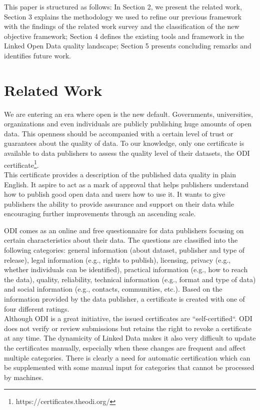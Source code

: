 \documentclass[onecolumn, crcready]{iosart2c}
\begin{document}
This paper is structured as follows: In Section 2, we present the related work, Section 3 explains the methodology we used to refine our previous framework with the findings of the related work survey and the classification of the new objective framework; Section 4 defines the existing tools and framework in the Linked Open Data quality landscape; Section 5 presents concluding remarks and identifies future work.

\section{Related Work}
We are entering an era where open is the new default. Governments, universities, organizations and even individuals are publicly publishing huge amounts of open data.  This openness should be accompanied with a certain level of trust or guarantees about the quality of data.  To our knowledge, only one certificate is available to data publishers to assess the quality level of their datasets, the ODI certificate\footnote {https://certificates.theodi.org/}.\\

This certificate provides a description of the published data quality in plain English. It aspire to act as a mark of approval that helps publishers understand how to publish good open data and users how to use it. It wants to give publishers the ability to provide assurance and support on their data while encouraging further improvements through an ascending scale.

ODI comes as an online and free questionnaire for data publishers focusing on certain characteristics about their data. The questions are classified into the following categories: general information (about dataset, publisher and type of release), legal information (e.g., rights to publish), licensing, privacy (e.g., whether individuals can be identified), practical information (e.g., how to reach the data), quality, reliability, technical information (e.g., format and type of data) and social information (e.g., contacts, communities, etc.). Based on the information provided  by the data  publisher,  a certificate  is created  with one of four different ratings.\\

Although ODI is a great initiative, the issued certificates are “self-certified“. ODI does not verify or review submissions but retains the right to revoke a certificate at any time. The dynamicity of Linked Data  makes it also very difficult to update the certificates manually, especially when these changes are frequent and affect multiple categories. There is clearly a need for automatic certification which can be supplemented with some manual input for categories that cannot be processed by machines.\\
\end{document}
